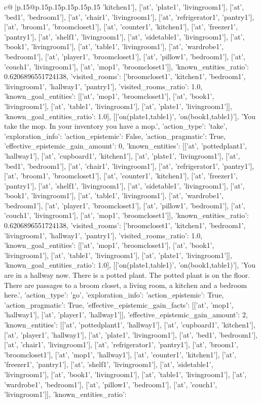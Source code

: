 \documentclass{article}
\begin{document}
{\begin{supertabular}{c@{$\;$}|p{.15\linewidth}@{}p{.15\linewidth}p{.15\linewidth}p{.15\linewidth}p{.15\linewidth}p{.15\linewidth}}
{{{'kitchen1'], ['at', 'plate1', 'livingroom1'], ['at', 'bed1', 'bedroom1'], ['at', 'chair1', 'livingroom1'], ['at', 'refrigerator1', 'pantry1'], ['at', 'broom1', 'broomcloset1'], ['at', 'counter1', 'kitchen1'], ['at', 'freezer1', 'pantry1'], ['at', 'shelf1', 'livingroom1'], ['at', 'sidetable1', 'livingroom1'], ['at', 'book1', 'livingroom1'], ['at', 'table1', 'livingroom1'], ['at', 'wardrobe1', 'bedroom1'], ['at', 'player1', 'broomcloset1'], ['at', 'pillow1', 'bedroom1'], ['at', 'couch1', 'livingroom1'], ['at', 'mop1', 'broomcloset1']], 'known_entities_ratio': 0.6206896551724138, 'visited_rooms': ['broomcloset1', 'kitchen1', 'bedroom1', 'livingroom1', 'hallway1', 'pantry1'], 'visited_rooms_ratio': 1.0, 'known_goal_entities': [['at', 'mop1', 'broomcloset1'], ['at', 'book1', 'livingroom1'], ['at', 'table1', 'livingroom1'], ['at', 'plate1', 'livingroom1']], 'known_goal_entities_ratio': 1.0}}], [['on(plate1,table1)', 'on(book1,table1)'], 'You take the mop. In your inventory you have a mop.', {'action_type': 'take', 'exploration_info': {'action_epistemic': False, 'action_pragmatic': True, 'effective_epistemic_gain_amount': 0, 'known_entities': [['at', 'pottedplant1', 'hallway1'], ['at', 'cupboard1', 'kitchen1'], ['at', 'plate1', 'livingroom1'], ['at', 'bed1', 'bedroom1'], ['at', 'chair1', 'livingroom1'], ['at', 'refrigerator1', 'pantry1'], ['at', 'broom1', 'broomcloset1'], ['at', 'counter1', 'kitchen1'], ['at', 'freezer1', 'pantry1'], ['at', 'shelf1', 'livingroom1'], ['at', 'sidetable1', 'livingroom1'], ['at', 'book1', 'livingroom1'], ['at', 'table1', 'livingroom1'], ['at', 'wardrobe1', 'bedroom1'], ['at', 'player1', 'broomcloset1'], ['at', 'pillow1', 'bedroom1'], ['at', 'couch1', 'livingroom1'], ['at', 'mop1', 'broomcloset1']], 'known_entities_ratio': 0.6206896551724138, 'visited_rooms': ['broomcloset1', 'kitchen1', 'bedroom1', 'livingroom1', 'hallway1', 'pantry1'], 'visited_rooms_ratio': 1.0, 'known_goal_entities': [['at', 'mop1', 'broomcloset1'], ['at', 'book1', 'livingroom1'], ['at', 'table1', 'livingroom1'], ['at', 'plate1', 'livingroom1']], 'known_goal_entities_ratio': 1.0}}], [['on(plate1,table1)', 'on(book1,table1)'], 'You are in a hallway now. There is a potted plant. The potted plant is on the floor. There are passages to a broom closet, a living room, a kitchen and a bedroom here.', {'action_type': 'go', 'exploration_info': {'action_epistemic': True, 'action_pragmatic': True, 'effective_epistemic_gain_facts': [['at', 'mop1', 'hallway1'], ['at', 'player1', 'hallway1']], 'effective_epistemic_gain_amount': 2, 'known_entities': [['at', 'pottedplant1', 'hallway1'], ['at', 'cupboard1', 'kitchen1'], ['at', 'player1', 'hallway1'], ['at', 'plate1', 'livingroom1'], ['at', 'bed1', 'bedroom1'], ['at', 'chair1', 'livingroom1'], ['at', 'refrigerator1', 'pantry1'], ['at', 'broom1', 'broomcloset1'], ['at', 'mop1', 'hallway1'], ['at', 'counter1', 'kitchen1'], ['at', 'freezer1', 'pantry1'], ['at', 'shelf1', 'livingroom1'], ['at', 'sidetable1', 'livingroom1'], ['at', 'book1', 'livingroom1'], ['at', 'table1', 'livingroom1'], ['at', 'wardrobe1', 'bedroom1'], ['at', 'pillow1', 'bedroom1'], ['at', 'couch1', 'livingroom1']], 'known_entities_ratio': }}}
\end{supertabular}}
\end{document}
